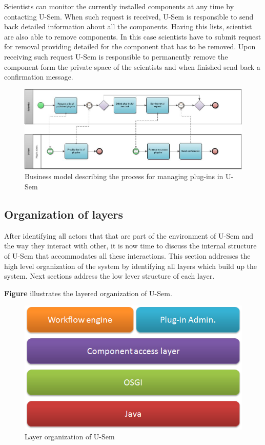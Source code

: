 Scientists can monitor the currently installed components at any time by contacting U-Sem. When such request is received, U-Sem is responsible to send back detailed information about all the components. Having this lists, scientist are also able to remove components. In this case scientists have to submit request for removal providing detailed for the component that has to be removed. Upon receiving such request U-Sem is responsible to permanently remove the component form the private space of the scientists and when finished send back a confirmation message.

\begin{figure}[h!]
  \centering
  	\includegraphics[scale=0.6]{plug-in/business_processes/PluginManagementBusinessModel.jpg}
  \caption{Business model describing the process for managing plug-ins in U-Sem}
\end{figure}

\subsection{Organization of layers}

After identifying all actors that that are part of the environment of U-Sem and the way they interact with other, it is now time to discuss the internal structure of U-Sem that accommodates all these interactions. This section addresses the high level organization of the system by identifying all layers which build up the system. Next sections address the low lever structure of each layer.

\textbf{Figure} illustrates the layered organization of U-Sem. 

\begin{figure}[h!]
  \centering
  	\includegraphics[scale=0.6]{plug-in/layers/layers.png}
  \caption{Layer organization of U-Sem}
\end{figure}

